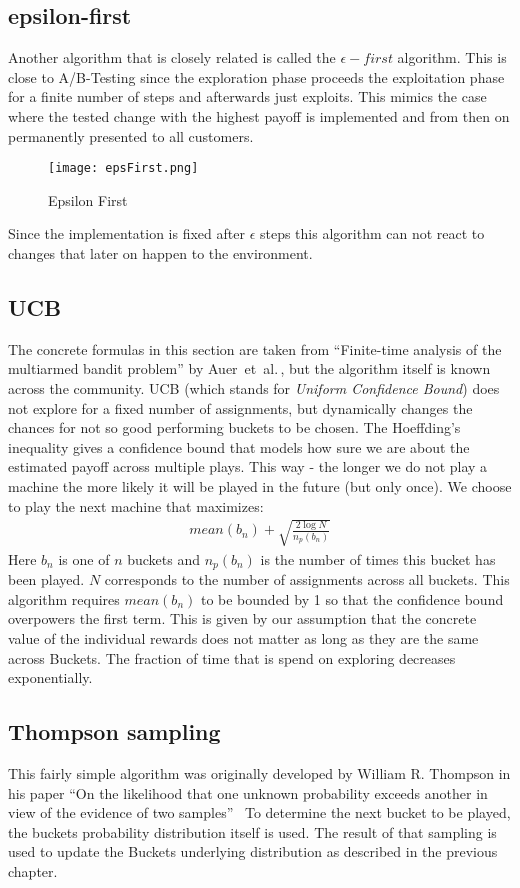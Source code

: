 \documentclass[main.tex]{subfiles}
\begin{document}
\subsection{epsilon-first}
Another algorithm that is closely related is called the $\epsilon-first$ algorithm. This is close to A/B-Testing since the exploration phase proceeds the exploitation phase for a finite number of steps and afterwards just exploits. This mimics the case where the tested change with the highest payoff is implemented and from then on permanently presented to all customers.
\begin{figure}[ht]
\texttt{[image: epsFirst.png]}
\centering
\caption{Epsilon First}
\label{fig:EpsiFir}
\end{figure}
Since the implementation is fixed after $\epsilon$ steps this algorithm can not react to changes that later on happen to the environment.

\subsection{UCB}
The concrete formulas in this section are taken from ``Finite-time analysis of the multiarmed bandit problem'' by Auer~et~al.\,\cite{auer2002finite}, but the algorithm itself is known across the community. UCB (which stands for \emph{Uniform Confidence Bound}) does not explore for a fixed number of assignments, but dynamically changes the chances for not so good performing buckets to be chosen. The Hoeffding's inequality gives a confidence bound that models how sure we are about the estimated payoff across multiple plays. This way - the longer we do not play a machine the more likely it will be played in the future (but only once). We choose to play the next machine that maximizes:
\begin{align*}
mean(b_n) + \sqrt{\frac{2\log{N}}{n_p(b_n)}}
\end{align*}
Here $b_n$ is one of $n$ buckets and $n_p(b_n)$ is the number of times this bucket has been played. $N$ corresponds to the number of assignments across all buckets. This algorithm requires $mean(b_n)$ to be bounded by 1 so that the confidence bound overpowers the first term. This is given by our assumption that the concrete value of the individual rewards does not matter as long as they are the same across Buckets. The fraction of time that is spend on exploring decreases exponentially.


\subsection{Thompson sampling}
This fairly simple algorithm was originally developed by William R. Thompson in his paper ``On the likelihood that one unknown probability exceeds another in view of the evidence of two samples''~\cite{thompson1933likelihood} To determine the next bucket to be played, the buckets probability distribution itself is used. The result of that sampling is used to update the Buckets underlying distribution as described in the previous chapter.
\end{document}
